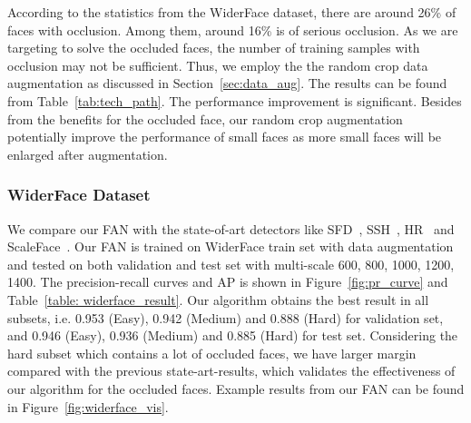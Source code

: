 \documentclass[10pt,twocolumn,letterpaper]{article}
\begin{document}
According to the statistics from the WiderFace dataset, there are around 26\% of faces with occlusion. Among them, around 16\% is of serious occlusion. As we are targeting to solve the occluded faces, the number of training samples with occlusion may not be sufficient. Thus, we employ the the random crop data augmentation as discussed in Section~\ref{sec:data_aug}. The results can be found from Table~\ref{tab:tech_path}. The performance improvement is significant. Besides from the benefits for the occluded face, our random crop augmentation potentially improve the performance of small faces as more small faces will be enlarged after augmentation.

\subsubsection{WiderFace Dataset}

We compare our FAN with the state-of-art detectors like SFD~\cite{zhang2017s3fd}, SSH~\cite{najibi2017ssh}, HR~\cite{Hu_2017_CVPR} and ScaleFace~\cite{yang2017face}. Our FAN is trained on WiderFace train set with data augmentation and tested on both validation and test set with multi-scale {600, 800, 1000, 1200, 1400}. The precision-recall curves and AP is shown in Figure~\ref{fig:pr_curve} and Table~\ref{table: widerface_result}. Our algorithm obtains the best result in all subsets, i.e. 0.953 (Easy), 0.942 (Medium) and 0.888 (Hard) for validation set, and 0.946 (Easy), 0.936 (Medium) and 0.885 (Hard) for test set. Considering the hard subset which contains a lot of occluded faces, we have larger margin compared with the previous state-art-results, which validates the effectiveness of our algorithm for the occluded faces. Example results from our FAN can be found in Figure~\ref{fig:widerface_vis}.

\end{document}
